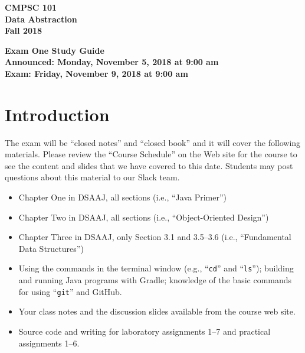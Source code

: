 \documentclass[11pt]{article}
\newcommand{\assignmentduedate}{November 9}
\newcommand{\assignmentassignedate}{November 5}
\newcommand{\assignmentnumber}{One}
\newcommand{\labyear}{2018}
\newcommand{\assignedday}{Monday}
\newcommand{\dueday}{Friday}
\newcommand{\labtime}{9:00 am}
\newcommand{\assigneddate}{Announced: \assignedday, \assignmentassignedate, \labyear{} at \labtime{}}
\newcommand{\duedate}{Exam: \dueday, \assignmentduedate, \labyear{} at \labtime{}}
\newcommand{\command}[1]{``\lstinline{#1}''}
\newcommand{\guidetitle}[1]
{
  \begin{center}
    \begin{center}
      \bf
      CMPSC 101\\Data Abstraction\\
      Fall 2018\\
      \medskip
    \end{center}
    \bf
    #1
  \end{center}
}
\begin{document}
\thispagestyle{empty}

\guidetitle{Exam \assignmentnumber{} Study Guide \\ \assigneddate{} \\ \duedate{}}

\section*{Introduction}

\noindent The exam will be ``closed notes'' and ``closed book'' and it will
cover the following materials. Please review the ``Course Schedule'' on the Web
site for the course to see the content and slides that we have covered to this
date. Students may post questions about this material to our Slack team.

\begin{itemize}

  \itemsep 0in

  \item Chapter One in DSAAJ, all sections (i.e., ``Java Primer'')

  \item Chapter Two in DSAAJ, all sections (i.e., ``Object-Oriented Design'')

  \item Chapter Three in DSAAJ, only Section 3.1 and 3.5--3.6 (i.e.,
    ``Fundamental Data Structures'')



  \item Using the commands in the terminal window (e.g., \command{cd} and
    \command{ls}); building and running Java programs with Gradle; knowledge of
    the basic commands for using \command{git} and GitHub.

  \item Your class notes and the discussion slides available from the course web
    site.

  \item Source code and writing for laboratory assignments 1--7 and practical
    assignments 1--6.

\end{itemize}
\end{document}
